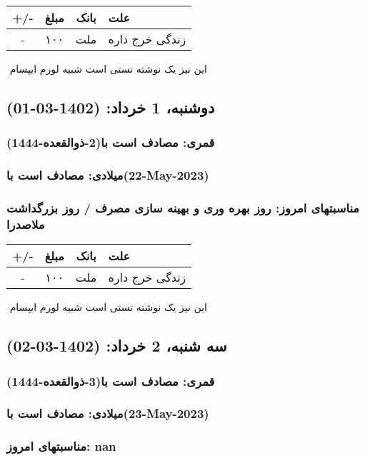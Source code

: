 \documentclass{article}
\newcommand{\rnote}[1]{\marginpar{\textcolor{color}{\StrSubstitute{\##1}{ }{\_}}}}
\newcommand{\myRow}[4]{
    #1 & #2 & #3 & #4 \\ \hline
}
\begin{document}
\begin{tabular}{ | c | c | c | p{5cm} |}
    \hline
    \myRow{ +/- }{مبلغ}{بانک}{علت}
    \myRow{-}{۱۰۰}{ملت}{زندگی خرج داره}
\end{tabular}
\newline
\newline

‌
\rnote{تست}
این نیز یک نوشته تستی است شبیه لورم ایپسام




\newpage
{}
\textcolor{color}{
\section{ دوشنبه، 1 خرداد: (1402-03-01) }
\subsubsection*{قمری: مصادف است با(2-ذوالقعده-1444)} 
\subsubsection*{میلادی: مصادف است با(22-May-2023)}
\subsubsection*{مناسبتهای امروز: روز بهره وری و بهینه سازی مصرف / روز بزرگداشت ملاصدرا}
}


\begin{tabular}{ | c | c | c | p{5cm} |}
    \hline
    \myRow{ +/- }{مبلغ}{بانک}{علت}
    \myRow{-}{۱۰۰}{ملت}{زندگی خرج داره}
\end{tabular}
\newline
\newline

‌
\rnote{تست}
این نیز یک نوشته تستی است شبیه لورم ایپسام




\newpage
{}
\textcolor{color}{
\section{ سه شنبه، 2 خرداد: (1402-03-02) }
\subsubsection*{قمری: مصادف است با(3-ذوالقعده-1444)} 
\subsubsection*{میلادی: مصادف است با(23-May-2023)}
\subsubsection*{مناسبتهای امروز: nan}
}
\end{document}
